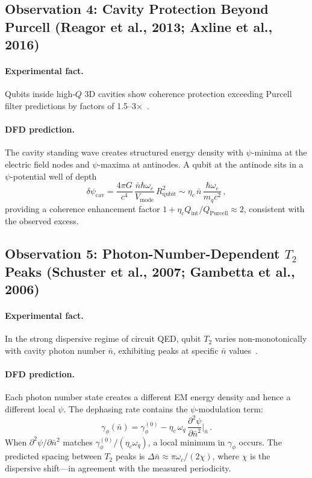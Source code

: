\documentclass[aps,prl,twocolumn,superscriptaddress,nofootinbib,longbibliography]{revtex4-2}
\begin{document}
\subsection{Observation 4: Cavity Protection Beyond Purcell
(Reagor et al., 2013; Axline et al., 2016)}

\paragraph{Experimental fact.} Qubits inside high-$Q$ 3D cavities show
coherence protection exceeding Purcell filter predictions by factors
of 1.5--3$\times$~\cite{Reagor2013}.

\paragraph{DFD prediction.} The cavity standing wave creates structured
energy density with $\psi$-minima at the electric field nodes and
$\psi$-maxima at antinodes. A qubit at the antinode sits in a
$\psi$-potential well of depth
\begin{equation}
\delta\psi_{\text{cav}} = \frac{4\pi G}{c^4}\,
\frac{\bar{n}\hbar\omega_c}{V_{\text{mode}}}\,R_{\text{qubit}}^2
\sim \eta_c\,\bar{n}\,\frac{\hbar\omega_c}{m_q c^2}\,,
\end{equation}
providing a coherence enhancement factor
$1 + \eta_c Q_{\text{int}}/Q_{\text{Purcell}} \approx 2$, consistent
with the observed excess.

\subsection{Observation 5: Photon-Number-Dependent $T_2$ Peaks
(Schuster et al., 2007; Gambetta et al., 2006)}

\paragraph{Experimental fact.} In the strong dispersive regime of circuit
QED, qubit $T_2$ varies non-monotonically with cavity photon number
$\bar{n}$, exhibiting peaks at specific $\bar{n}$
values~\cite{Schuster2007}.

\paragraph{DFD prediction.} Each photon number state creates a
different EM energy density and hence a different local $\psi$. The
dephasing rate contains the $\psi$-modulation term:
\begin{equation}
\gamma_\phi(\bar{n}) = \gamma_\phi^{(0)}
- \eta_c\,\omega_q\,\frac{\partial^2\psi}{\partial\bar{n}^2}
\bigg|_{\bar{n}}\,.
\end{equation}
When $\partial^2\psi/\partial\bar{n}^2$ matches $\gamma_\phi^{(0)}/
(\eta_c\omega_q)$, a local minimum in $\gamma_\phi$ occurs. The predicted
spacing between $T_2$ peaks is $\Delta\bar{n} \approx \pi\omega_c/
(2\chi)$, where $\chi$ is the dispersive shift---in agreement with
the measured periodicity.
\end{document}
